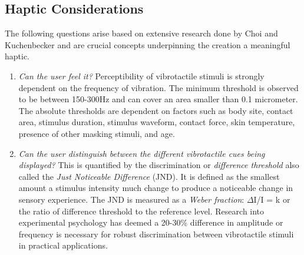 \subsection{Haptic Considerations}
The following questions arise based on extensive research done by Choi and Kuchenbecker \cite{choi2013vibrotactile} and are crucial concepts underpinning the creation a meaningful haptic.
\begin{enumerate}
    \item \emph{Can the user feel it?}
Perceptibility of vibrotactile stimuli is strongly dependent on the frequency of vibration. The minimum threshold is observed to be between 150-300Hz and can cover an area smaller than 0.1 micrometer. The absolute thresholds are dependent on factors such as body site, contact area, stimulus duration, stimulus waveform, contact force, skin temperature, presence of other masking stimuli, and age.

    \item \emph{Can the user distinguish between the different vibrotactile cues being displayed?}
This is quantified by the discrimination or \textit{difference threshold} also called the \textit{Just Noticeable Difference} (JND). It is defined as the smallest amount a stimulus intensity much change to produce a noticeable change in sensory experience. The JND is measured as a \textit{Weber fraction}:
${\Delta}$I/I = k or the ratio of difference threshold to the reference level.
Research into experimental psychology has deemed a 20-30\% difference in amplitude or frequency is necessary for robust discrimination between vibrotactile stimuli in practical applications.


\end{enumerate}
